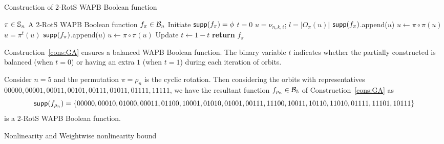 \documentclass{llncs}
\begin{document}
\begin{constr}
\caption{Construction of 2-RotS WAPB Boolean function\label{cons:GA}}
\begin{algorithmic}
\Require $\pi \in \mathbb{S}_n$ %
\Ensure A 2-RotS WAPB Boolean function $f_\pi \in \mathcal{B}_n$
\State Initiate $\mathsf{supp}(f_\pi) = \phi$
\State $t = 0$
		\State $u = \nu_{n,k,i}$; $l= |O_\pi(u)|$
				\State $\mathsf{supp}(f_\pi)$.append($u$)
				\State $ u \gets \pi \circ \pi(u)$
			\EndFor
		\Else
			\State $u = \pi^{t}(u)$
				\State $\mathsf{supp}(f_\pi)$.append($u$)
				\State $ u \gets \pi \circ \pi(u)$ 
			\EndFor 
			\State Update $t \gets 1 - t$
		\EndIf
	\EndFor
\EndFor
\State \textbf{return} $f_\pi$
\end{algorithmic}

\end{constr}
Construction~\ref{cons:GA} ensures a balanced WAPB Boolean function. The binary variable $t$ indicates whether the partially constructed is balanced (when $t = 0$) or having an extra $1$ (when $t = 1$) during each iteration of orbits.
\begin{example}
Consider $n = 5$ and the permutation $\pi = \rho_n$ is the cyclic rotation. Then considering the orbits with representatives $00000, 00001, 00011, 00101, 00111, 01011, 01111, 11111$, we have the resultant function $f_{\rho_n} \in \mathcal{B}_{5}$ of Construction~\ref{cons:GA} as $$\mathsf{supp}(f_{\rho_n}) = \{00000, 00010, 01000, 00011, 01100, 10001, 01010, 01001, 00111, 11100, 10011, 10110, 11010, 01111, 11101, 10111\}$$
is a 2-RotS WAPB Boolean function.
\end{example}
\begin{theorem}
Nonlinearity and Weightwise nonlinearity bound
\end{theorem}
\end{document}
